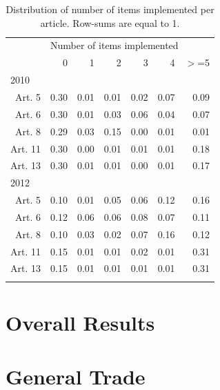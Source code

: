 \documentclass[10pt]{article}
\begin{document}
\begin{table}[ht]
\centering
\begin{tabular}{rrrrrrr}
  \toprule
&  \multicolumn{6}{l}{Number of items implemented}\\
 &  0 &  1 &  2 &  3 &  4 & $>$=5 \\ 
  \midrule
\multicolumn{6}{l}{2010}\\
Art. 5 & 0.30 & 0.01 & 0.01 & 0.02 & 0.07 & 0.09 \\ 
  Art. 6 & 0.30 & 0.01 & 0.03 & 0.06 & 0.04 & 0.07 \\ 
  Art. 8 & 0.29 & 0.03 & 0.15 & 0.00 & 0.01 & 0.01 \\ 
  Art. 11 & 0.30 & 0.00 & 0.01 & 0.01 & 0.01 & 0.18 \\ 
  Art. 13 & 0.30 & 0.01 & 0.01 & 0.00 & 0.01 & 0.17 \\ 
   \midrule
\multicolumn{6}{l}{2012}\\
Art. 5 & 0.10 & 0.01 & 0.05 & 0.06 & 0.12 & 0.16 \\ 
  Art. 6 & 0.12 & 0.06 & 0.06 & 0.08 & 0.07 & 0.11 \\ 
  Art. 8 & 0.10 & 0.03 & 0.02 & 0.07 & 0.16 & 0.12 \\ 
  Art. 11 & 0.15 & 0.01 & 0.01 & 0.02 & 0.01 & 0.31 \\ 
  Art. 13 & 0.15 & 0.01 & 0.01 & 0.01 & 0.01 & 0.31 \\ 
   \bottomrule
\multicolumn{6}{l}{}\\
\end{tabular}
\caption{Distribution of number of items implemented per article. Row-sums are equal to 1.} 
\end{table}

\pagebreak

\clearpage\section{Overall Results}







\appendix

\clearpage\section{General Trade}
\end{document}
